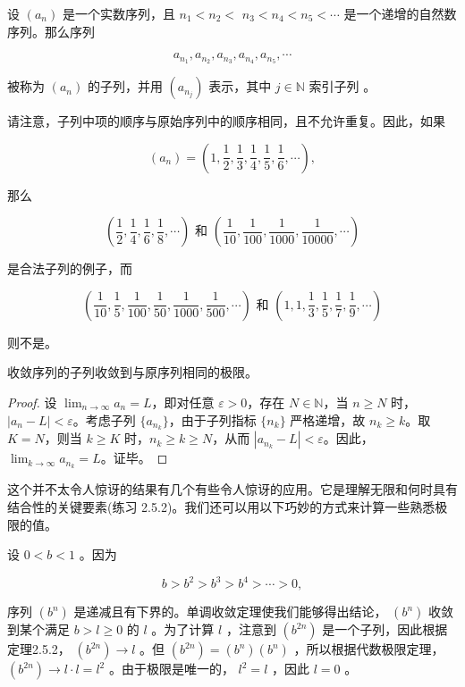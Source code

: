 \begin{Def}
  \label{def:2.5.1}
设 \(\left( {a}_{n}\right)\) 是一个实数序列，且 \({n}_{1} < {n}_{2} <\)  \({n}_{3} < {n}_{4} < {n}_{5} < \cdots\) 是一个递增的自然数序列。那么序列

\[
{a}_{{n}_{1}},{a}_{{n}_{2}},{a}_{{n}_{3}},{a}_{{n}_{4}},{a}_{{n}_{5}},\cdots
\]

被称为 \(\left( {a}_{n}\right)\) 的子列，并用 \(\left( {a}_{{n}_{j}}\right)\) 表示，其中 \(j \in  \mathbb{N}\) 索引子列 。
\end{Def}

请注意，子列中项的顺序与原始序列中的顺序相同，且不允许重复。因此，如果

\[
\left( {a}_{n}\right)  = \left( {1,\frac{1}{2},\frac{1}{3},\frac{1}{4},\frac{1}{5},\frac{1}{6},\cdots }\right) ,
\]

那么

\[
\left( {\frac{1}{2},\frac{1}{4},\frac{1}{6},\frac{1}{8},\cdots }\right) \text{ 和 }\left( {\frac{1}{10},\frac{1}{100},\frac{1}{1000},\frac{1}{10000},\cdots }\right)
\]

是合法子列的例子，而

\[
\left( {\frac{1}{10},\frac{1}{5},\frac{1}{100},\frac{1}{50},\frac{1}{1000},\frac{1}{500},\cdots }\right) \text{ 和 }\left( {1,1,\frac{1}{3},\frac{1}{5},\frac{1}{7},\frac{1}{9},\cdots }\right)
\]

则不是。

\begin{Thm}
  \label{thm:2.5.2}
  收敛序列的子列收敛到与原序列相同的极限。
\end{Thm}


\begin{proof}
  设 \(\lim_{n \to \infty} a_n = L\)，即对任意 \(\varepsilon > 0\)，存在 \(N \in \mathbb{N}\)，当 \(n \geq N\) 时，\(|a_n - L| < \varepsilon\)。考虑子列 \(\{a_{n_k}\}\)，由于子列指标 \(\{n_k\}\) 严格递增，故 \(n_k \geq k\)。取 \(K = N\)，则当 \(k \geq K\) 时，\(n_k \geq k \geq N\)，从而 \(|a_{n_k} - L| < \varepsilon\)。因此，\(\lim_{k \to \infty} a_{n_k} = L\)。证毕。
\end{proof}


这个并不太令人惊讶的结果有几个有些令人惊讶的应用。它是理解无限和何时具有结合性的关键要素(练习 2.5.2)。我们还可以用以下巧妙的方式来计算一些熟悉极限的值。

\begin{Eg}
  \label{eg:2.5.3}
设 \(0 < b < 1\) 。因为

\[
b > {b}^{2} > {b}^{3} > {b}^{4} > \cdots  > 0,
\]

序列 \(\left( {b}^{n}\right)\) 是递减且有下界的。单调收敛定理使我们能够得出结论， \(\left( {b}^{n}\right)\) 收敛到某个满足 \(b > l \geq  0\) 的 \(l\) 。为了计算 \(l\) ，注意到 \(\left( {b}^{2n}\right)\) 是一个子列，因此根据定理2.5.2， \(\left( {b}^{2n}\right)  \rightarrow  l\) 。但 \(\left( {b}^{2n}\right)  = \left( {b}^{n}\right) \left( {b}^{n}\right)\) ，所以根据代数极限定理， \(\left( {b}^{2n}\right)  \rightarrow  l \cdot  l = {l}^{2}\) 。由于极限是唯一的， \({l}^{2} = l\) ，因此 \(l = 0\) 。  
\end{Eg}


